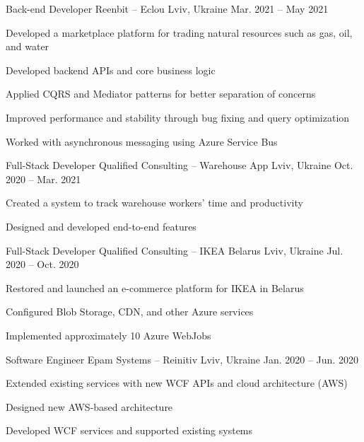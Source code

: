 \begin{cventries}
  \cventry
    {Back-end Developer} %
    {Reenbit – Eclou} %
    {Lviv, Ukraine} %
    {Mar. 2021 – May 2021} %
    {
      \begin{cvitems} %
        \item {Developed a marketplace platform for trading natural resources such as gas, oil, and water}
        \item {Developed backend APIs and core business logic}
        \item {Applied CQRS and Mediator patterns for better separation of concerns}
        \item {Improved performance and stability through bug fixing and query optimization}
        \item {Worked with asynchronous messaging using Azure Service Bus}
      \end{cvitems}
    }

  \cventry
    {Full-Stack Developer} %
    {Qualified Consulting – Warehouse App} %
    {Lviv, Ukraine} %
    {Oct. 2020 – Mar. 2021} %
    {
      \begin{cvitems} %
        \item {Created a system to track warehouse workers' time and productivity}
        \item {Designed and developed end-to-end features}
      \end{cvitems}
    }

  \cventry
    {Full-Stack Developer} %
    {Qualified Consulting – IKEA Belarus} %
    {Lviv, Ukraine} %
    {Jul. 2020 – Oct. 2020} %
    {
      \begin{cvitems} %
        \item {Restored and launched an e-commerce platform for IKEA in Belarus}
        \item {Configured Blob Storage, CDN, and other Azure services}
        \item {Implemented approximately 10 Azure WebJobs}
      \end{cvitems}
    }

  \cventry
    {Software Engineer} %
    {Epam Systems – Reinitiv} %
    {Lviv, Ukraine} %
    {Jan. 2020 – Jun. 2020} %
    {
      \begin{cvitems} %
        \item {Extended existing services with new WCF APIs and cloud architecture (AWS)}
        \item {Designed new AWS-based architecture}
        \item {Developed WCF services and supported existing systems}
      \end{cvitems}
    }


\end{cventries}

